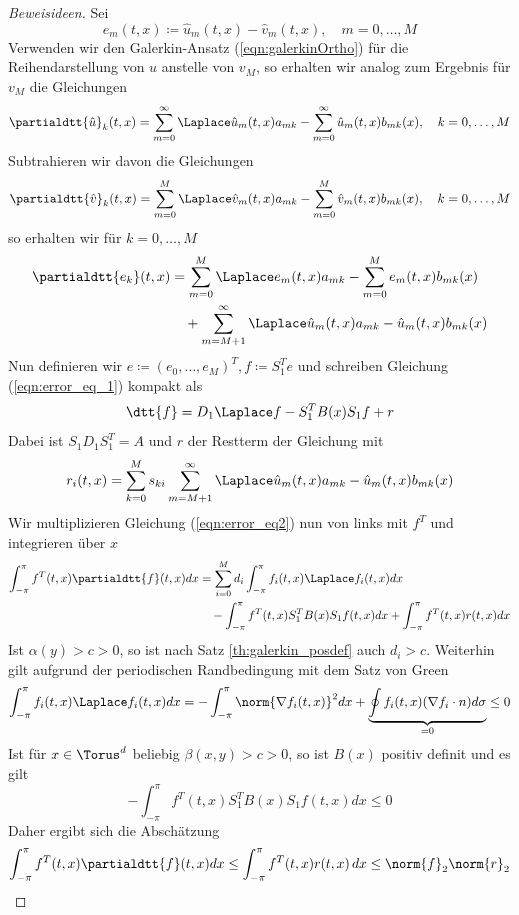 \begin{proof}[Beweisideen]
Sei 
\[e_m(t,x)\coloneqq \hat{u}_m(t,x)-\hat{v}_m(t,x),\quad m=0,\dots,M\]
Verwenden wir den Galerkin-Ansatz (\ref{eqn:galerkinOrtho}) für die Reihendarstellung von $u$ anstelle von $v_M$, so erhalten wir analog zum Ergebnis für $v_M$ die Gleichungen
\begin{equation}
\partialdtt{\hat{u}}_k(t,x)=\sum_{m=0}^\infty \Laplace \hat{u}_m(t,x)a_{mk}-\sum_{m=0}^\infty \hat{u}_m(t,x)b_{mk}(x),\quad k=0,\dots,M
\end{equation}
Subtrahieren wir davon die Gleichungen
\begin{equation}
\partialdtt{\hat{v}}_k(t,x)=\sum_{m=0}^M\Laplace \hat{v}_m(t,x)a_{mk}-\sum_{m=0}^M\hat{v}_m(t,x)b_{mk}(x),\quad k=0,\dots,M
\end{equation}
so erhalten wir für $k=0,\dots,M$
\begin{equation}
\label{eqn:error_eq_1}
\begin{split}
\partialdtt{e_k}(t,x)&=\sum_{m=0}^M\Laplace e_m(t,x)a_{mk}-\sum_{m=0}^M e_m(t,x)b_{mk}(x)\\
&\quad +\sum_{m=M+1}^\infty \Laplace \hat{u}_m(t,x)a_{mk}-\hat{u}_m(t,x)b_{mk}(x)
\end{split}
\end{equation}
Nun definieren wir $e\coloneqq (e_0,\dots,e_M)^T, f\coloneqq S_1^Te$ und schreiben Gleichung (\ref{eqn:error_eq_1}) kompakt als
\begin{equation}
\label{eqn:error_eq2}
\dtt{f}=D_1\Laplace f-S_1^TB(x)S_1f+r
\end{equation}
Dabei ist $S_1D_1S_1^T=A$ und $r$ der Restterm der Gleichung mit
\[r_{i}(t,x)=\sum_{k=0}^Ms_{ki}\sum_{m=M+1}^\infty \Laplace \hat{u}_m(t,x)a_{mk}-\hat{u}_m(t,x)b_{mk}(x)\]
Wir multiplizieren Gleichung (\ref{eqn:error_eq2}) nun von links mit $f^T$ und integrieren über $x$
\begin{align*}
\int_{-\pi}^\pi f^T(t,x)\partialdtt{f}(t,x)dx&=\sum_{i=0}^M d_i\int_{-\pi}^\pi f_i(t,x)\Laplace f_i(t,x)dx\\
&\quad -\int_{-\pi}^\pi f^T(t,x)S_1^TB(x)S_1f(t,x)dx+\int_{-\pi}^\pi f^T(t,x)r(t,x)dx
\end{align*}
Ist $\alpha(y)>c>0$, so ist nach Satz \ref{th:galerkin_posdef} auch $d_i>c$. Weiterhin gilt aufgrund der periodischen Randbedingung mit dem Satz von Green
\[\int_{-\pi}^\pi f_i(t,x)\Laplace f_i(t,x)dx=-\int_{-\pi}^\pi \norm{\nabla f_i(t,x)}^2dx+\underbrace{\oint f_i(t,x)(\nabla f_i\cdot n)d\sigma}_{=0}\le 0\]
Ist für $x\in\Torus^d$ beliebig $\beta(x,y)>c>0$, so ist $B(x)$ positiv definit und es gilt
\[-\int_{-\pi}^\pi f^T(t,x)S_1^TB(x)S_1f(t,x)dx\le 0\]
Daher ergibt sich die Abschätzung
\begin{equation}
\int_{-\pi}^\pi f^T(t,x)\partialdtt{f}(t,x)dx\le \int_{-\pi}^\pi f^T(t,x)r(t,x)\,dx\le \norm{f}_2\norm{r}_2 
\end{equation}
\end{proof}
